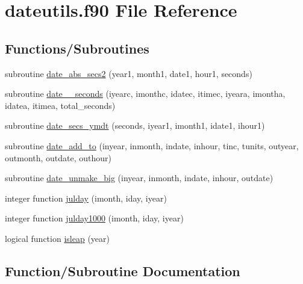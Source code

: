 \hypertarget{dateutils_8f90}{}\section{dateutils.\+f90 File Reference}
\label{dateutils_8f90}
\subsection*{Functions/\+Subroutines}
\begin{DoxyCompactItemize}
\item 
subroutine \hyperlink{dateutils_8f90_a56423cc8c95e08c48faaadf0ae9a2100}{date\+\_\+abs\+\_\+secs2} (year1, month1, date1, hour1, seconds)
\item 
subroutine \hyperlink{dateutils_8f90_a5f9be0094541c4d3ba8275a70f89db9d}{date\+\_\+\_\+seconds} (iyearc, imonthc, idatec, itimec, iyeara, imontha, idatea, itimea, total\+\_\+seconds)
\item 
subroutine \hyperlink{dateutils_8f90_abd0aaee09a0949cfef32003dae34f41d}{date\+\_\+secs\+\_\+ymdt} (seconds, iyear1, imonth1, idate1, ihour1)
\item 
subroutine \hyperlink{dateutils_8f90_a14143487767c309bad9fe0bef4365fda}{date\+\_\+add\+\_\+to} (inyear, inmonth, indate, inhour, tinc, tunits, outyear, outmonth, outdate, outhour)
\item 
subroutine \hyperlink{dateutils_8f90_a151300a087ebed5a3efb44a63988654c}{date\+\_\+unmake\+\_\+big} (inyear, inmonth, indate, inhour, outdate)
\item 
integer function \hyperlink{dateutils_8f90_ab4306c1f20ef02cf582fb1050fa0c5d9}{julday} (imonth, iday, iyear)
\item 
integer function \hyperlink{dateutils_8f90_a9e268003476faf6e3551f0b04714231a}{julday1000} (imonth, iday, iyear)
\item 
logical function \hyperlink{dateutils_8f90_acbfdb1c78beb593447108203011b380c}{isleap} (year)
\end{DoxyCompactItemize}


\subsection{Function/\+Subroutine Documentation}
\mbox{\label{dateutils_8f90_a5f9be0094541c4d3ba8275a70f89db9d}} 
